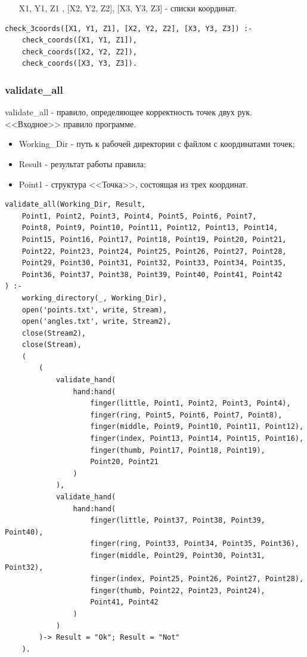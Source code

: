 \begin{itemize}
	\item [X1, Y1, Z1], [X2, Y2, Z2], [X3, Y3, Z3] - списки координат.
\end{itemize}

\begin{lstlisting}[caption=Реализация правила check\_3coords, label=rules:check3coords]
check_3coords([X1, Y1, Z1], [X2, Y2, Z2], [X3, Y3, Z3]) :-
	check_coords([X1, Y1, Z1]),
	check_coords([X2, Y2, Z2]),
	check_coords([X3, Y3, Z3]).
\end{lstlisting}

\subsubsection{validate\_all}
\hspace{0.6cm} validate\_all - правило, определяющее корректность точек двух рук. <<Входное>> правило программе.

\begin{itemize}
	\item Working\_Dir - путь к рабочей директории с файлом с координатами точек;
	\item Result - результат работы правила;
	\item Point1 - структура <<Точка>>, состоящая из трех координат.
\end{itemize}

\begin{lstlisting}[caption=Реализация правила validate\_all, label=rules:validateall]
validate_all(Working_Dir, Result,
	Point1, Point2, Point3, Point4, Point5, Point6, Point7,
	Point8, Point9, Point10, Point11, Point12, Point13, Point14,
	Point15, Point16, Point17, Point18, Point19, Point20, Point21,
	Point22, Point23, Point24, Point25, Point26, Point27, Point28,
	Point29, Point30, Point31, Point32, Point33, Point34, Point35,
	Point36, Point37, Point38, Point39, Point40, Point41, Point42
) :-
	working_directory(_, Working_Dir),
	open('points.txt', write, Stream),
	open('angles.txt', write, Stream2),
	close(Stream2),
	close(Stream),
	(	
		(
			validate_hand(
				hand:hand(
					finger(little, Point1, Point2, Point3, Point4),
					finger(ring, Point5, Point6, Point7, Point8),
					finger(middle, Point9, Point10, Point11, Point12),
					finger(index, Point13, Point14, Point15, Point16),
					finger(thumb, Point17, Point18, Point19),
					Point20, Point21
				)
			),
			validate_hand(
				hand:hand(
					finger(little, Point37, Point38, Point39, Point40),
					finger(ring, Point33, Point34, Point35, Point36),
					finger(middle, Point29, Point30, Point31, Point32),
					finger(index, Point25, Point26, Point27, Point28),
					finger(thumb, Point22, Point23, Point24),
					Point41, Point42
				)
			)
		)-> Result = "Ok"; Result = "Not"
	).
\end{lstlisting}

